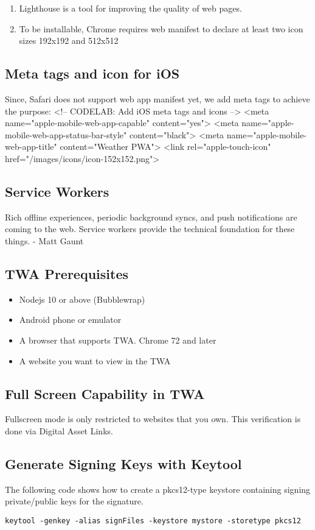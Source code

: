 \documentclass{article}
\begin{document}
\begin{enumerate}
	\item Lighthouse is a tool for improving the quality of web pages. 
	\item To be installable, Chrome requires web manifest to declare at least two icon sizes 192x192 and 512x512

\end{enumerate}
\subsection{Meta tags and icon for iOS}
Since, Safari does not support web app manifest yet, we add meta tags to achieve the purpose: 
<!-- CODELAB: Add iOS meta tags and icons -->
<meta name="apple-mobile-web-app-capable" content="yes">
<meta name="apple-mobile-web-app-status-bar-style" content="black">
<meta name="apple-mobile-web-app-title" content="Weather PWA">
<link rel="apple-touch-icon" href="/images/icons/icon-152x152.png">

\subsection{Service Workers}
Rich offline experiences, periodic background syncs, and push notifications are coming to the web. Service workers provide the technical foundation for these things. - Matt Gaunt

\subsection{TWA Prerequisites}
\begin{itemize}
	\item Nodejs 10 or above (Bubblewrap)
	\item Android phone or emulator
	\item A browser that supports TWA. Chrome 72 and later
	\item A website you want to view in the TWA
\end{itemize}

\subsection{Full Screen Capability in TWA}
Fullscreen mode is only restricted to websites that you own. This verification is done via Digital Asset Links.

\subsection{Generate Signing Keys with Keytool}
The following code shows how to create a pkcs12-type keystore containing signing private/public keys for the signature.
\begin{verbatim}
keytool -genkey -alias signFiles -keystore mystore -storetype pkcs12
\end{verbatim}
\end{document}
